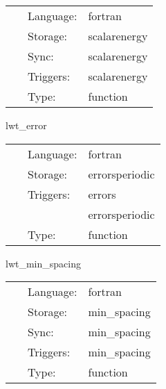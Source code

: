 \hspace{5mm}

 \begin{tabular*}{160mm}{cll} 
~ & Language:  & fortran \\ 
~ & Storage:  & scalarenergy \\ 
~ & Sync:  & scalarenergy \\ 
~ & Triggers:  & scalarenergy \\ 
~ & Type:  & function \\ 
\end{tabular*} 


\vspace{5mm}


\hspace{5mm} lwt\_error 

\hspace{5mm}{\it calculate errors of the solution } 


\hspace{5mm}

 \begin{tabular*}{160mm}{cll} 
~ & Language:  & fortran \\ 
~ & Storage:  & errorsperiodic \\ 
~ & Triggers:  & errors \\ 
~& ~ &errorsperiodic\\ 
~ & Type:  & function \\ 
\end{tabular*} 


\vspace{5mm}


\hspace{5mm} lwt\_min\_spacing 

\hspace{5mm}{\it calculate the smallest grid spacing } 


\hspace{5mm}

 \begin{tabular*}{160mm}{cll} 
~ & Language:  & fortran \\ 
~ & Storage:  & min\_spacing \\ 
~ & Sync:  & min\_spacing \\ 
~ & Triggers:  & min\_spacing \\ 
~ & Type:  & function \\ 
\end{tabular*} 



